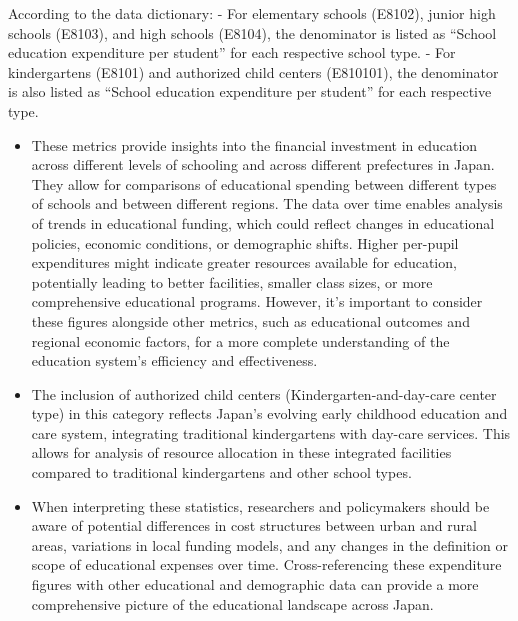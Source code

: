 \documentclass[
]{ltjarticle}
\begin{document}
According to the data dictionary: - For elementary schools (E8102),
junior high schools (E8103), and high schools (E8104), the denominator
is listed as ``School education expenditure per student'' for each
respective school type. - For kindergartens (E8101) and authorized child
centers (E810101), the denominator is also listed as ``School education
expenditure per student'' for each respective type.

\begin{itemize}
\item
  These metrics provide insights into the financial investment in
  education across different levels of schooling and across different
  prefectures in Japan. They allow for comparisons of educational
  spending between different types of schools and between different
  regions. The data over time enables analysis of trends in educational
  funding, which could reflect changes in educational policies, economic
  conditions, or demographic shifts. Higher per-pupil expenditures might
  indicate greater resources available for education, potentially
  leading to better facilities, smaller class sizes, or more
  comprehensive educational programs. However, it's important to
  consider these figures alongside other metrics, such as educational
  outcomes and regional economic factors, for a more complete
  understanding of the education system's efficiency and effectiveness.
\item
  The inclusion of authorized child centers (Kindergarten-and-day-care
  center type) in this category reflects Japan's evolving early
  childhood education and care system, integrating traditional
  kindergartens with day-care services. This allows for analysis of
  resource allocation in these integrated facilities compared to
  traditional kindergartens and other school types.
\item
  When interpreting these statistics, researchers and policymakers
  should be aware of potential differences in cost structures between
  urban and rural areas, variations in local funding models, and any
  changes in the definition or scope of educational expenses over time.
  Cross-referencing these expenditure figures with other educational and
  demographic data can provide a more comprehensive picture of the
  educational landscape across Japan.
\end{itemize}
\end{document}
